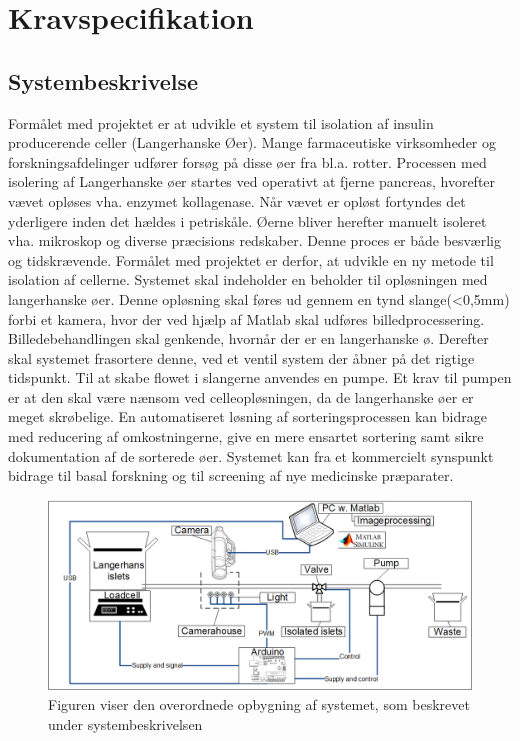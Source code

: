 \chapter{Kravspecifikation} \label{ch:ks}




\newpage
\section{Systembeskrivelse}
Formålet med projektet er at udvikle et system til isolation af insulin producerende celler (Langerhanske Øer). Mange farmaceutiske virksomheder og forskningsafdelinger udfører forsøg på disse øer fra bl.a. rotter. Processen med isolering af Langerhanske øer startes ved operativt at fjerne pancreas, hvorefter vævet opløses vha. enzymet kollagenase. Når vævet er opløst fortyndes det yderligere inden det hældes i petriskåle. Øerne bliver herefter manuelt isoleret vha. mikroskop og diverse præcisions redskaber. Denne proces er både besværlig og tidskrævende. Formålet med projektet er derfor, at udvikle en ny metode til isolation af cellerne. Systemet skal indeholder en beholder til opløsningen med langerhanske øer. Denne opløsning skal føres ud gennem en tynd slange(<0,5mm)  forbi et kamera, hvor der ved hjælp af Matlab skal udføres billedprocessering. Billedebehandlingen skal genkende, hvornår der er en langerhanske ø. Derefter skal systemet frasortere denne, ved et ventil system der åbner på det rigtige tidspunkt. Til at skabe flowet i slangerne anvendes en pumpe.  Et krav til pumpen er at den skal være nænsom ved celleopløsningen, da de langerhanske øer er meget skrøbelige.
En automatiseret løsning af sorteringsprocessen kan bidrage med reducering af omkostningerne, give en mere ensartet sortering samt sikre dokumentation af de sorterede øer. Systemet kan fra et kommercielt synspunkt bidrage til basal forskning og til screening af nye medicinske præparater.

\begin{figure}[H]
	\centering
	\includegraphics[width=1\textwidth]{billeder/Overview.png}
	\caption{Figuren viser den overordnede opbygning af systemet, som beskrevet under systembeskrivelsen}
	\label{fig:usecase}
\end{figure}

